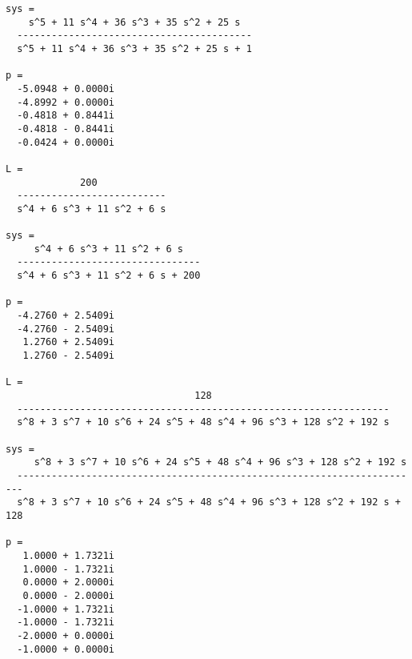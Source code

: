 \begin{ejercicio}
\begin{enumerate}
\begin{verbatim}
sys =
    s^5 + 11 s^4 + 36 s^3 + 35 s^2 + 25 s
  -----------------------------------------
  s^5 + 11 s^4 + 36 s^3 + 35 s^2 + 25 s + 1

p =
  -5.0948 + 0.0000i
  -4.8992 + 0.0000i
  -0.4818 + 0.8441i
  -0.4818 - 0.8441i
  -0.0424 + 0.0000i

L =
             200
  --------------------------
  s^4 + 6 s^3 + 11 s^2 + 6 s

sys =
     s^4 + 6 s^3 + 11 s^2 + 6 s
  --------------------------------
  s^4 + 6 s^3 + 11 s^2 + 6 s + 200

p =
  -4.2760 + 2.5409i
  -4.2760 - 2.5409i
   1.2760 + 2.5409i
   1.2760 - 2.5409i

L =
                                 128
  -----------------------------------------------------------------
  s^8 + 3 s^7 + 10 s^6 + 24 s^5 + 48 s^4 + 96 s^3 + 128 s^2 + 192 s

sys =
     s^8 + 3 s^7 + 10 s^6 + 24 s^5 + 48 s^4 + 96 s^3 + 128 s^2 + 192 s
  -----------------------------------------------------------------------
  s^8 + 3 s^7 + 10 s^6 + 24 s^5 + 48 s^4 + 96 s^3 + 128 s^2 + 192 s + 128

p =
   1.0000 + 1.7321i
   1.0000 - 1.7321i
   0.0000 + 2.0000i
   0.0000 - 2.0000i
  -1.0000 + 1.7321i
  -1.0000 - 1.7321i
  -2.0000 + 0.0000i
  -1.0000 + 0.0000i
    \end{verbatim}
  \end{enumerate}
\end{ejercicio}